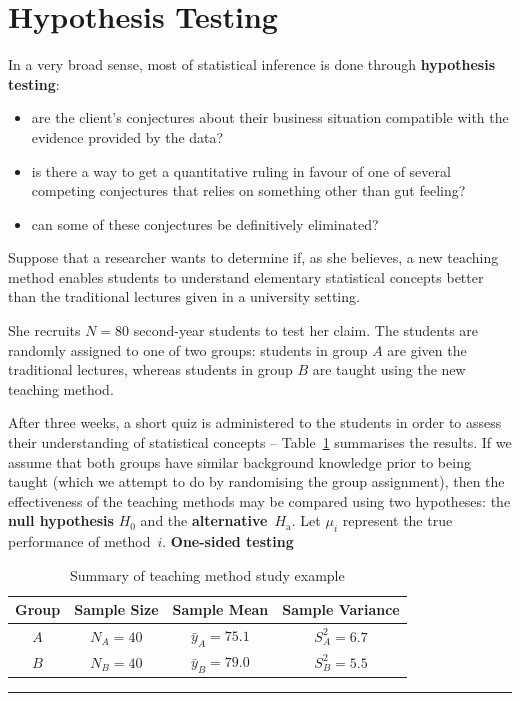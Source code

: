 
\section{Hypothesis Testing}\label{sec:Hyp.Testing}
In a very broad sense, most of statistical inference is done through \textbf{hypothesis testing}: 
\begin{itemize}[noitemsep]
\item are the client's conjectures about their business situation compatible with the evidence provided by the data? 
\item is there a way to get a quantitative ruling in favour of one of several competing conjectures that relies on something other than gut feeling? 
\item can some of these conjectures be definitively eliminated?  \end{itemize}  Suppose that a researcher wants to determine if, as she believes, a new teaching method enables students to understand elementary statistical concepts better than the traditional lectures given in a university setting. \par She recruits  $N=80$ second-year students to test her claim. The students are randomly assigned to one of two groups: students in group $A$ are given the traditional lectures, whereas students in group $B$ are taught using the new teaching method. \par After three weeks, a short quiz is administered to the students in order to assess their understanding of statistical concepts -- Table~\ref{tab:SA1} summarises the results. 
\newl If we assume that both groups have similar background knowledge prior to being taught (which we attempt to do by randomising the group assignment), then the effectiveness of the teaching methods may be compared using two hypotheses: the \textbf{null hypothesis} $H_0$ and the \textbf{alternative}~$H_{\textrm{a}}$. Let $\mu_i$ represent the true performance of method~$i$. \newpage\noindent \textbf{One-sided testing}
     \begin{table}[t]
      \centering
     
         \begin{tabular}{c c c c}
         \hline
         \textbf{Group} & \textbf{Sample Size} & \textbf{Sample Mean} & \textbf{Sample Variance} \\
         \hline
         $A$ & $N_{A} = 40$ & $\bar{y}_{A} = 75.1$ & $S^{2}_{A}=6.7$ \\
         $B$ & $N_{B} = 40$ & $\bar{y}_{B} = 79.0$ & $S^{2}_{B}=5.5$ \\
        \hline
         \end{tabular}
     \caption[\small Summary of teaching method study example]{\small Summary of teaching method study example}
         \label{tab:SA1}\hrule
    
     \end{table}
